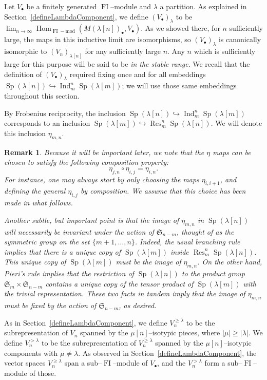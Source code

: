 \documentclass[10pt]{amsart}
\DeclareMathOperator{\FI}{FI}
\DeclareMathOperator{\Hom}{Hom}
\DeclareMathOperator{\Res}{Res}
\DeclareMathOperator{\Ind}{Ind}
\DeclareMathOperator{\Sp}{Sp}
\newcommand{\Sn}{\mathfrak{S}}
\newcommand{\dt}{\bullet}
\newtheorem{remark}[theorem]{Remark}
\theoremstyle{definition}
\newcommand{\into}{\hookrightarrow}
\begin{document}
Let $V_{\bullet}$ be a finitely generated $\FI$--module and $\lambda$ a partition. As explained in Section~\ref{defineLambdaComponent}, we define $(V_\bullet)_{\lambda}$ to be $\lim_{n \to \infty} \Hom_{\FI-\text{mod}}(M(\lambda[n])_\bullet, V_{\bullet})$. As we showed there, for $n$ sufficiently large, the maps in this inductive limit are isomorphisms, so $(V_\dt)_{\lambda}$ is canonically isomorphic to $(V_n)_{\lambda[n]}$ for any sufficiently large $n$. Any $n$ which is sufficiently large for this purpose will be said to be \emph{in the stable range}. We recall that the definition of $(V_\dt)_{\lambda}$ required fixing once and for all embeddings $\Sp(\lambda[n]) \into \Ind_m^{n} \Sp(\lambda[m])$; we will use those same embeddings throughout this section.

By Frobenius reciprocity, the inclusion $\Sp(\lambda[n]) \into \Ind_m^{n} \Sp(\lambda[m])$ corresponds to an inclusion $\Sp(\lambda[m]) \into \Res^n_m \Sp(\lambda[n])$. We will denote this inclusion $\eta_{m,n}$. 

\begin{remark}\label{subtle}
Because it will be important later, we note that the $\eta$ maps can be chosen to satisfy the following composition property:
\[
\eta_{j,n} \circ \eta_{i,j} = \eta_{i,n}.
\]
For instance, one may always start by only choosing the maps $\eta_{i,i+1}$, and defining the general $\eta_{i,j}$ by composition. We assume that this choice has been made in what follows.

Another subtle, but important point is that the image of $\eta_{m,n}$ in $\Sp(\lambda[n])$ will necessarily be invariant under the action of $\Sn_{n-m}$, thought of as the symmetric group on the set $\{m+1,\ldots,n\}$. Indeed, the usual branching rule implies that there is a unique copy of $\Sp(\lambda[m])$ inside $\Res_m^n \Sp(\lambda[n])$. This unique copy of $\Sp(\lambda[m])$ must be the image of $\eta_{m,n}$. On the other hand, Pieri's rule implies that the restriction of $\Sp(\lambda[n])$ to the product group $\Sn_m \times \Sn_{n-m}$ contains a unique copy of the tensor product of $\Sp(\lambda[m])$ with the trivial representation. These two facts in tandem imply that the image of $\eta_{m,n}$ must be fixed by the action of $\Sn_{n-m}$, as desired.
\end{remark}

As in Section~\ref{defineLambdaComponent}, we define $V^{\geq \lambda}_n$ to be the subrepresentation of $V_n$ spanned by the $\mu[n]$--isotypic pieces, where $|\mu| \geq |\lambda|$. We define $V^{> \lambda}_n$ to be the subrepresentation of $V^{\geq \lambda}_n$ spanned by the $\mu[n]$--isotypic components with $\mu \neq \lambda$. As observed in Section~\ref{defineLambdaComponent}, the vector spaces $V^{\geq \lambda}_n$ span a sub--$\FI$--module of $V_{\bullet}$, and the $V^{>\lambda}_n$ form a sub--$\FI$--module of those. 
\end{document}

